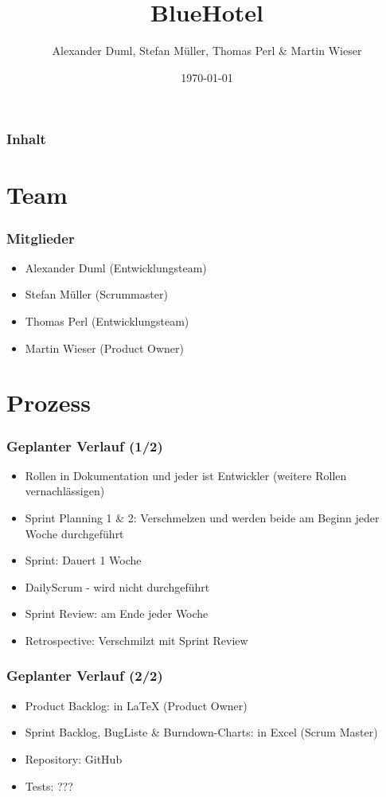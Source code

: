 \documentclass{beamer}
\begin{document}
\title{BlueHotel}  
\author{Alexander Duml, Stefan M\"uller, Thomas Perl \& Martin Wieser}
\date{\today} 

\begin{frame}
\titlepage
\end{frame} 

\begin{frame}
\frametitle{Inhalt}\tableofcontents
\end{frame} 



\section{Team} 

\begin{frame}
\frametitle{Mitglieder} 
\begin{itemize}
\item Alexander Duml (Entwicklungsteam)
\item Stefan M\"uller (Scrummaster)
\item Thomas Perl (Entwicklungsteam)
\item Martin Wieser (Product Owner)
\end{itemize}
\end{frame}

\section{Prozess} 

\begin{frame}
\frametitle{Geplanter Verlauf (1/2)} 
\begin{itemize}
\item Rollen in Dokumentation und jeder ist Entwickler (weitere Rollen vernachl\"assigen)
\item Sprint Planning 1 \& 2: Verschmelzen und werden beide am Beginn jeder Woche durchgef\"uhrt
\item Sprint: Dauert 1 Woche
\item DailyScrum - wird nicht durchgef\"uhrt
\item Sprint Review: am Ende jeder Woche
\item Retrospective: Verschmilzt mit Sprint Review
\end{itemize}
\end{frame}

\begin{frame}
\frametitle{Geplanter Verlauf (2/2)} 
\begin{itemize}
\item Product Backlog: in LaTeX (Product Owner)
\item Sprint Backlog, BugListe \& Burndown-Charts: in Excel (Scrum Master)
\item Repository: GitHub
\item Tests: ???
\end{itemize}
\end{frame}
\end{document}
